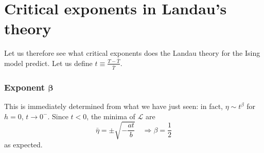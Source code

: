 \documentclass[../main/main.tex]{subfiles}
\begin{document}
\begin{figure}[h!]
\begin{minipage}[c]{0.5\linewidth}
\end{minipage}
\begin{minipage}[]{0.5\linewidth}
\centering
{}
\end{minipage}
\caption{\label{fig:} }
\end{figure}



\section{Critical exponents in Landau's theory}
Let us therefore see what critical exponents does the Landau theory for the Ising model predict. Let us define \( t \equiv \frac{T- \bar{T} }{\bar{T} } \).

\subsubsection{Exponent \( \pmb{\beta}  \)}
This is immediately determined from what we have just seen: in fact, \( \eta \sim t^\beta  \) for \( h=0 \), \( t \rightarrow 0^- \). Since \( t<0 \), the minima of \( \mathcal{L} \) are
\begin{equation*}
  \bar{\eta } = \pm \sqrt{- \frac{at}{b}} \quad \Rightarrow  \beta = \frac{1}{2}
\end{equation*}
as expected.
\end{document}
